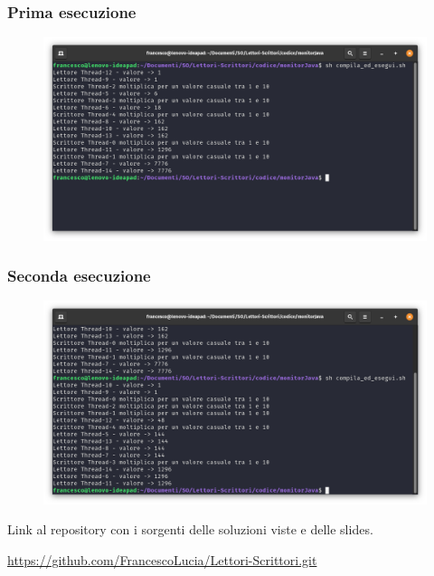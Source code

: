 \documentclass[10pt]{beamer}
\begin{document}
	\begin{frame}[fragile]
		\frametitle{Prima esecuzione}
		\begin{figure}
			\centering
			\includegraphics[width=1.03\linewidth]{img/esecuzione/programJ1}
		\end{figure}
	\end{frame}

	\begin{frame}[fragile]
		\frametitle{Seconda esecuzione}
		\begin{figure}
			\centering
			\includegraphics[width=1.03\linewidth]{img/esecuzione/programJ2}
		\end{figure}
	\end{frame}
	

	
	
	\begin{frame}
		\centerline{Link al repository con i sorgenti delle soluzioni viste e delle slides.}
		
		\centerline{\href{https://github.com/FrancescoLucia/Lettori-Scrittori.git}{https://github.com/FrancescoLucia/Lettori-Scrittori.git}}
	\end{frame}
	
	
\end{document}
